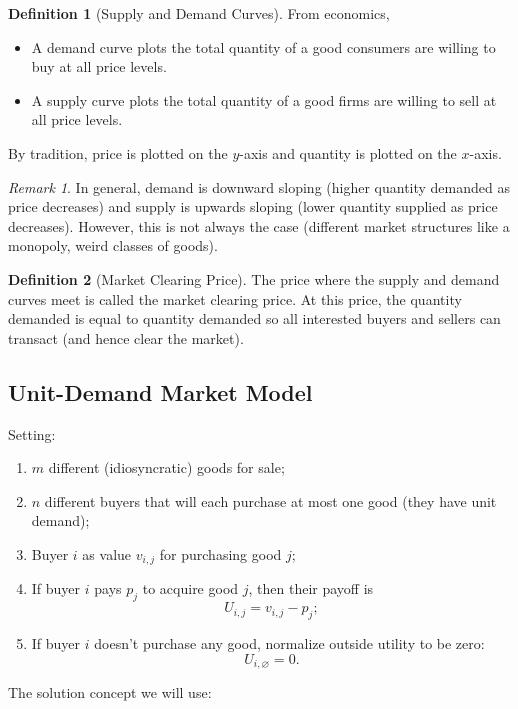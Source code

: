 \documentclass[dvipsnames]{article}
\theoremstyle{definition}
\newtheorem{definition}{Definition}[section]
\theoremstyle{remark}
\newtheorem*{remark}{Remark}
\begin{document}
\begin{definition}[Supply and Demand Curves]
	From economics,
	\begin{itemize}
		\item A demand curve plots the total quantity of a good consumers are willing to buy at all price levels.
		\item A supply curve plots the total quantity of a good firms are willing to sell at all price levels.
	\end{itemize}
	By tradition, price is plotted on the $y$-axis and quantity is plotted on the $x$-axis.
\end{definition}

\begin{remark}
	In general, demand is downward sloping (higher quantity demanded as price decreases) and supply is upwards sloping (lower quantity supplied as price decreases). However, this is not always the case (different market structures like a monopoly, weird classes of goods).
\end{remark}

\begin{definition}[Market Clearing Price]
	The price where the supply and demand curves meet is called the market clearing price. At this price, the quantity demanded is equal to quantity demanded so all interested buyers and sellers can transact (and hence clear the market). 
\end{definition}

\subsection{Unit-Demand Market Model}

Setting:
\begin{enumerate}
	\item $m$ different (idiosyncratic) goods for sale;
	\item $n$ different buyers that will each purchase at most one good (they have unit demand);
	\item Buyer $i$ as value $v_{i,j}$ for purchasing good $j$;
	\item If buyer $i$ pays $p_j$ to acquire good $j$, then their payoff is
	$$U_{i,j} = v_{i,j} - p_j;$$
	\item If buyer $i$ doesn't purchase any good, normalize outside utility to be zero:
	$$U_{i, \varnothing} = 0.$$
\end{enumerate}

The solution concept we will use:
\end{document}
